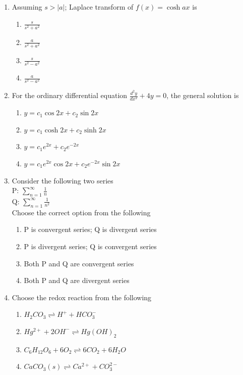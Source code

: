 \documentclass[journal]{IEEEtran}
\begin{document}
\begin{enumerate}[resume]
\item Assuming $s > |a|$; Laplace transform of $f(x) = \cosh ax$ is
\hfill{}
\begin{enumerate}
\item $\frac{s}{s^2+a^2}$
\item $\frac{a}{s^2+a^2}$
\item $\frac{s}{s^2-a^2}$
\item $\frac{a}{s^2-a^2}$
\end{enumerate}

\item For the ordinary differential equation $\frac{d^2y}{dx^2} + 4y = 0$, the general solution is
\hfill{}
\begin{enumerate}
\item $y = c_1 \cos 2x + c_2 \sin 2x$
\item $y = c_1 \cosh 2x + c_2 \sinh 2x$
\item $y = c_1 e^{2x} + c_2 e^{-2x}$
\item $y = c_1 e^{2x} \cos 2x + c_2 e^{-2x} \sin 2x$
\end{enumerate}

\item Consider the following two series \\
P: $\sum_{n=1}^{\infty} \frac{1}{n}$ \\
Q: $\sum_{n=1}^{\infty} \frac{1}{n^2}$ \\
Choose the correct option from the following
\hfill{}
\begin{enumerate}
\item P is convergent series; Q is divergent series
\item P is divergent series; Q is convergent series
\item Both P and Q are convergent series
\item Both P and Q are divergent series
\end{enumerate}

\item Choose the redox reaction from the following
\hfill{}
\begin{enumerate}
\item $H_2CO_3 \rightleftharpoons H^+ + HCO_3^-$
\item $Hg^{2+} + 2OH^- \rightleftharpoons Hg(OH)_2$
\item $C_6H_{12}O_6 + 6O_2 \rightleftharpoons 6CO_2 + 6H_2O$
\item $CaCO_3 (s) \rightleftharpoons Ca^{2+} + CO_3^{2-}$
\end{enumerate}


\end{enumerate}
\end{document}
